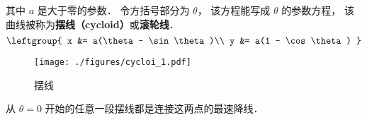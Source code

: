 
\begin{issues}
\issueDraft
\end{issues}

其中 $a$ 是大于零的参数． 令方括号部分为 $\theta$， 该方程能写成 $\theta$ 的参数方程， 该曲线被称为\textbf{摆线（cycloid）}或\textbf{滚轮线}． %
\begin{equation}
\leftgroup{
x &= a(\theta - \sin\theta)\\
y &= a(1 - \cos\theta)
}\end{equation}
\begin{figure}[ht]
\centering
\texttt{[image: ./figures/cycloi\_1.pdf]}
\caption{摆线} \label{cycloi_fig1}
\end{figure}


从 $\theta = 0$ 开始的任意一段摆线都是连接这两点的最速降线． 
